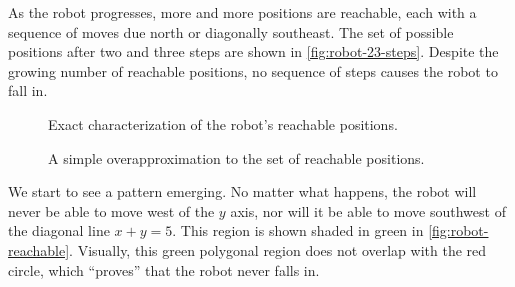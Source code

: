 As the robot progresses, more and more positions are reachable,
  each with a sequence of moves due north or diagonally southeast.
The set of possible positions after two and three steps
  are shown in \cref{fig:robot-23-steps}.
Despite the growing number of reachable positions,
  no sequence of steps causes the robot to fall in.

\begin{figure}[t]
  \hfil%
  \begin{minipage}{0.45\linewidth}
    \centering
    \caption{Exact characterization of the robot's reachable positions.}
    \label{fig:robot-reachable}
  \end{minipage}%
  \hfil%
  \begin{minipage}{0.45\linewidth}
    \centering
    \caption{A simple overapproximation to the set of reachable positions.}
    \label{fig:robot-inductive-invariant}
  \end{minipage}
  \hfil%
\end{figure}

We start to see a pattern emerging.
No matter what happens,
  the robot will never be able to move west of the $y$ axis,
  nor will it be able to move southwest
    of the diagonal line $x + y = 5$.
This region is shown shaded in green in \cref{fig:robot-reachable}.
Visually, this green polygonal region does not overlap with the red circle,
  which ``proves'' that the robot never falls in.


